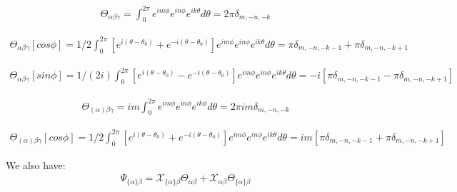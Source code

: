 \documentclass{Note}
\begin{document}
\begin{equation}
\begin{aligned}
\Theta_{\alpha\beta\gamma}=\int_0^{2\pi} e^{im\phi} e^{in\phi}  e^{ik\theta} d\theta
=2\pi \delta_{m,-n,-k}
\end{aligned}
\end{equation}

\begin{equation}
\begin{aligned}
\Theta_{\alpha\beta\gamma}[cos\phi]=1/2 \int_0^{2\pi} [e^{i(\theta-\theta_0)}+e^{-i(\theta-\theta_0)}]  e^{im\phi} e^{in\phi}  e^{ik\theta} d\theta
=\pi \delta_{m,-n,-k-1}+\pi \delta_{m,-n,-k+1}
\end{aligned}
\end{equation}


\begin{equation}
\begin{aligned}
\Theta_{\alpha\beta\gamma}[sin\phi]=1/(2i) \int_0^{2\pi} [e^{i(\theta-\theta_0)}-e^{-i(\theta-\theta_0)}]  e^{im\phi} e^{in\phi}  e^{ik\theta} d\theta
=-i[\pi \delta_{m,-n,-k-1}-\pi \delta_{m,-n,-k+1}]
\end{aligned}
\end{equation}

\begin{equation}
\begin{aligned}
\Theta_{(\alpha)\beta\gamma}=im \int_0^{2\pi} e^{im\phi} e^{in\phi}  e^{ik\phi} d\theta
=2\pi im\delta_{m,-n,-k}
\end{aligned}
\end{equation}

\begin{equation}
\begin{aligned}
\Theta_{(\alpha)\beta\gamma}[cos\phi]=1/2 \int_0^{2\pi} [e^{i(\theta-\theta_0)}+e^{-i(\theta-\theta_0)}]  e^{im\phi} e^{in\phi}  e^{ik\theta} d\theta
=im[\pi \delta_{m,-n,-k-1}+\pi \delta_{m,-n,-k+1}]
\end{aligned}
\end{equation}

We also have:
\begin{equation}
\begin{aligned}
\Psi_{\{\alpha\}\beta}=\mathcal{X}_{\{\alpha\}\beta}\Theta_{\alpha\beta}+\mathcal{X}_{\alpha\beta}\Theta_{\{\alpha\}\beta}
\end{aligned}
\end{equation}
\end{document}

